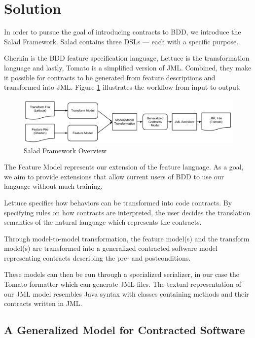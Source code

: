 \section{Solution}
\label{sec:Solution}

In order to pursue the goal of introducing contracts to BDD, we introduce the Salad Framework. Salad contains three DSLs --- each with a specific purpose.

Gherkin is the BDD feature specification language, Lettuce is the transformation language and lastly, Tomato is a simplified version of JML.  Combined, they make it possible for contracts to be generated from feature descriptions and transformed into JML. Figure \ref{fig:saladoverview} illustrates the workflow from input to output.

\begin{figure}
  \begin{center}
    \includegraphics[scale=0.32]{images/framework_overview.png}
  \end{center}
  \caption{Salad Framework Overview}
  \label{fig:saladoverview}
\end{figure}

The Feature Model represents our extension of the feature language.
As a goal, we aim to provide extensions that allow current users of BDD to use
our language without much training.

Lettuce specifies how behaviors can be transformed into code contracts.
By specifying rules on how contracts are interpreted, the user decides the translation semantics of the natural language which represents the contracts. 

Through model-to-model transformation, the feature model(s) and the transform model(s) are transformed into a generalized contracted software model representing contracts describing the pre- and postconditions. 

These models can then be run through a specialized serializer, in our case the Tomato formatter which can generate JML files.
The textual representation of our JML model resembles Java syntax with classes containing methods and their contracts written in JML. 

\subsection{A Generalized Model for Contracted Software}
\label{sub:AGeneralizedModelforContractedSoftware}

